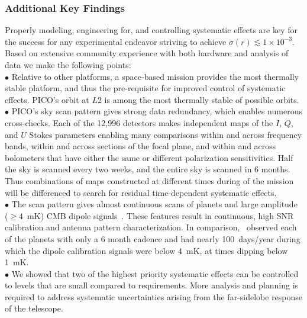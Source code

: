 \documentclass[PICOReport.tex]{subfiles}
\begin{document}
\subsubsection{Additional Key Findings}
\label{sec:systematics_key}

Properly modeling, engineering for, and controlling systematic effects are key for the success for any experimental endeavor striving to achieve $\sigma(r) \lesssim 1 \times 10^{-3}$. Based on extensive community experience with both hardware and analysis of data we make the following points: \\
$\bullet$ \hspace{0.1in}  Relative to other platforms, a space-based mission provides the most thermally stable platform, and thus the pre-requisite for improved control of systematic effects. PICO's orbit at $L2$ is among the most thermally stable of possible orbits. \\
$\bullet$ \hspace{0.1in} PICO's sky scan pattern gives strong data redundancy, which enables numerous cross-checks. Each of the 12,996 detectors makes independent maps of the $I,\,Q$, and $U$ Stokes parameters enabling many comparisons within and across frequency bands, within and across sections of the focal plane, and within and across bolometers that have either the same or different polarization sensitivities. Half the sky is scanned every two weeks, and the entire sky is scanned in 6 months. Thus combinations of maps constructed at different times during of the mission will be differenced to search for residual time-dependent systematic effects. \\
$\bullet$ \hspace{0.1in}  The scan pattern gives almost continuous scans of planets and large amplitude ($\geq 4$~mK) CMB dipole signals~\citep{dipole_memo}. These features result in continuous, high \ac{SNR} calibration and antenna pattern characterization. In comparison, \planck\ observed each of the planets with only a 6 month cadence and had nearly 100~days/year during which the dipole calibration signals were below 4~mK, at times dipping below 1~mK. \\
$\bullet$ \hspace{0.1in}  We showed that two of the highest priority systematic effects can be controlled to levels that are small compared to requirements. More analysis and planning is required to address systematic uncertainties arising from the far-sidelobe response of the telescope. 
\end{document}
